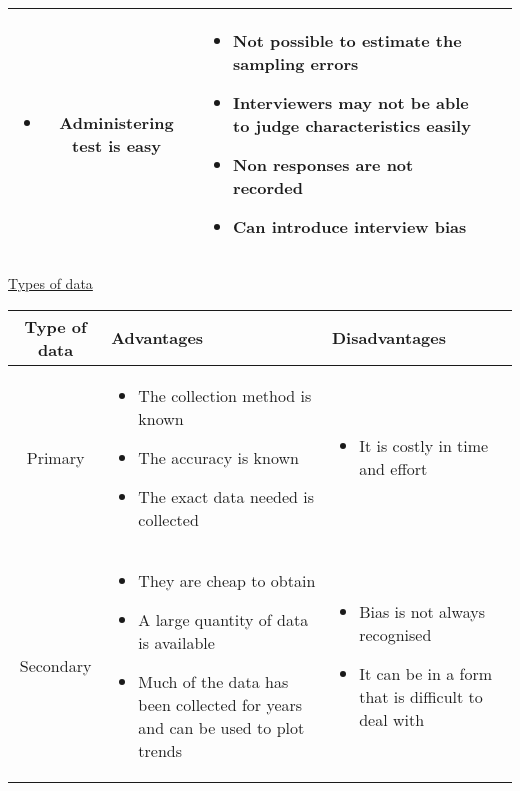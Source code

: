 \documentclass{article}[18pt]
\begin{document}
\begin{tabularx}{\textwidth}{|c|X|X|X|}
\begin{itemize}[noitemsep,topsep=0pt,leftmargin=*]
\item Administering test is easy
\end{itemize}&
\begin{itemize}[noitemsep,topsep=0pt,leftmargin=*]
\item Not possible to estimate the sampling errors
\item Interviewers may not be able to judge characteristics easily
\item Non responses are not recorded
\item Can introduce interview bias
\end{itemize}\\
\hline
\end{tabularx}
\newpage
\begin{center}
\underline{\huge Types of data}
\end{center}
\begin{tabularx}{\textwidth}{|c|X|X|}
\hline
Type of data&Advantages&Disadvantages\\
\hline
Primary&
\begin{itemize}[noitemsep,topsep=0pt,leftmargin=*]
\item The collection method is known
\item The accuracy is known
\item The exact data needed is collected
\end{itemize}&
\begin{itemize}[noitemsep,topsep=0pt,leftmargin=*]
\item It is costly in time and effort
\end{itemize}\\
\hline
Secondary&
\begin{itemize}[noitemsep,topsep=0pt,leftmargin=*]
\item They are cheap to obtain
\item A large quantity of data is available
\item Much of the data has been collected for years and can be used to plot trends
\end{itemize}&
\begin{itemize}[noitemsep,topsep=0pt,leftmargin=*]
\item Bias is not always recognised
\item It can be in a form that is difficult to deal with
\end{itemize}\\
\hline





\end{tabularx}
\end{document}
